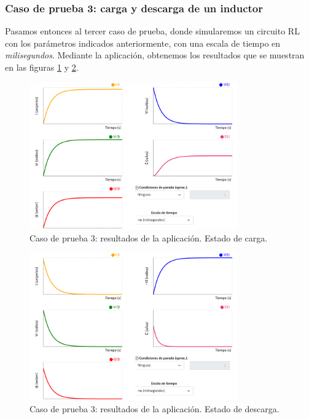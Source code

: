 \documentclass[../main.tex]{subfiles}
\begin{document}
\subsubsection{Caso de prueba 3: carga y descarga de un inductor}
Pasamos entonces al tercer caso de prueba, donde simularemos un circuito RL con los parámetros indicados anteriormente, con una escala de tiempo en \textit{milisegundos}. Mediante la aplicación, obtenemos los resultados que se muestran en las figuras \ref{fig::cp3-app} y \ref{fig::cp3.1-app}.

\begin{figure}[!h]
    \centering
    \includegraphics[width=0.8\textwidth]{images/cp3-1.PNG}
    \caption{Caso de prueba 3: resultados de la aplicación. Estado de carga.}
    \label{fig::cp3-app}
\end{figure}

\begin{figure}[!h]
    \centering
    \includegraphics[width=0.8\textwidth]{images/cp3-1.1.PNG}
    \caption{Caso de prueba 3: resultados de la aplicación. Estado de descarga.}
    \label{fig::cp3.1-app}
\end{figure}
\end{document}
